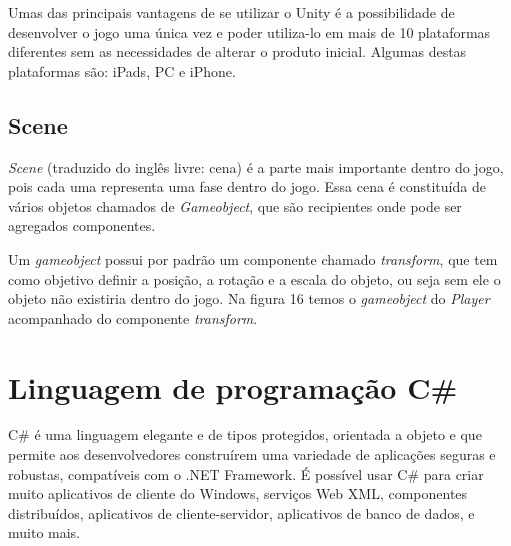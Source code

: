 Umas das principais vantagens de se utilizar o Unity é a possibilidade de desenvolver o jogo uma única vez e poder utiliza-lo em mais de 10 plataformas diferentes sem as necessidades de alterar o produto inicial. 
Algumas destas plataformas são: iPads, PC e iPhone. \cite{unt}

\subsection {Scene}

\textit{Scene} (traduzido do inglês livre: cena) é a parte mais importante dentro do jogo, pois cada uma representa uma fase dentro do jogo. Essa cena é constituída de vários objetos chamados de \textit{Gameobject}, que são recipientes onde pode ser agregados componentes.

Um \textit{gameobject} possui por padrão um componente chamado \textit{transform}, que tem como objetivo definir a posição, a rotação e a escala do objeto, ou seja sem ele o objeto não existiria dentro do jogo.
Na figura 16 temos o \textit {gameobject} do \textit {Player} acompanhado do componente \textit {transform}. \cite{unt}

\begin{figure}[h!]
		\centering
	\end{figure}


\section{Linguagem de programação C\#}
\label{sec:Linguagem-de-programação-Csharp}

C\# é uma linguagem elegante e de tipos protegidos, orientada a objeto e que permite aos desenvolvedores construírem uma variedade de aplicações seguras e robustas, compatíveis com o .NET Framework. É possível usar C\# para criar muito aplicativos de cliente do Windows, serviços Web XML, componentes distribuídos, aplicativos de cliente-servidor, aplicativos de banco de dados, e muito mais. 

